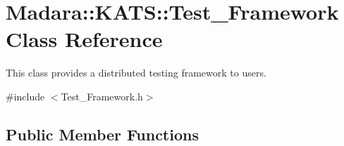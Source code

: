 \hypertarget{classMadara_1_1KATS_1_1Test__Framework}{
\section{Madara::KATS::Test\_\-Framework Class Reference}
\label{de/dc6/classMadara_1_1KATS_1_1Test__Framework}
}


This class provides a distributed testing framework to users.  




{\ttfamily \#include $<$Test\_\-Framework.h$>$}

\subsection*{Public Member Functions}
